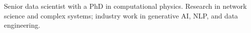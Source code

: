 
%


Senior data scientist with a PhD in computational physics. Research in network science and complex systems; industry work in generative AI, NLP, and data engineering.
